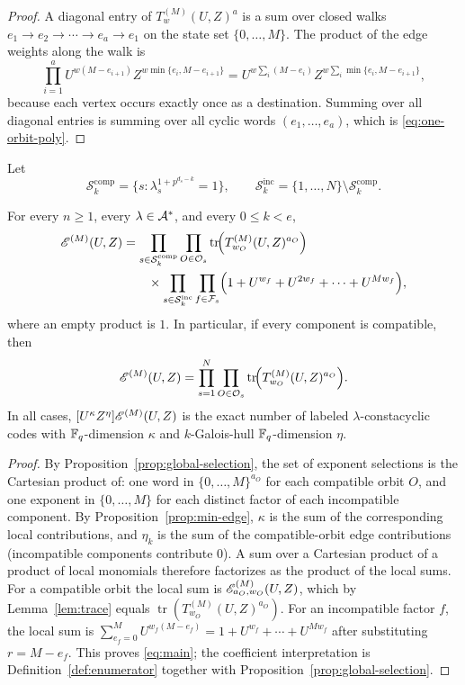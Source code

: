 \begin{proof}
A diagonal entry of $T^{(M)}_w(U,Z)^a$ is a sum over closed walks
$e_1\to e_2\to\cdots\to e_a\to e_1$ on the state set $\{0,\ldots,M\}$.
The product of the edge weights along the walk is
\[
\prod_{i=1}^{a}U^{w(M-e_{i+1})}Z^{w\min\{e_i,M-e_{i+1}\}}
 =U^{w\sum_i(M-e_i)}Z^{w\sum_i\min\{e_i,M-e_{i+1}\}},
\]
because each vertex occurs exactly once as a destination.  Summing over all
diagonal entries is summing over all cyclic words $(e_1,\ldots,e_a)$, which is
\eqref{eq:one-orbit-poly}.
\end{proof}

Let
\[
\mathcal{S}_k^{\mathrm{comp}}
 =\{s:\lambda_s^{1+p^{d_s-k}}=1\},
\qquad
\mathcal{S}_k^{\mathrm{inc}}=\{1,\ldots,N\}\setminus
                               \mathcal{S}_k^{\mathrm{comp}} .
\]

\begin{theorem}\label{thm:main}
For every $n\geq1$, every $\lambda\in\mathcal A^\ast$, and every $0\leq k<e$,
\begin{align}
\mathscr E^{(M)}(U,Z)
&=\prod_{s\in\mathcal{S}_k^{\mathrm{comp}}}
   \prod_{O\in\mathcal O_s}
     \operatorname{tr}\!\Bigl(T^{(M)}_{w_O}(U,Z)^{a_O}\Bigr)
   \notag\\
&\qquad\times
  \prod_{s\in\mathcal{S}_k^{\mathrm{inc}}}
   \prod_{f\in\mathcal F_s}
     \Bigl(1+U^{w_f}+U^{2w_f}+\cdots+U^{Mw_f}\Bigr),
\label{eq:main}
\end{align}
where an empty product is $1$.  In particular, if every component is
compatible, then
\[
\mathscr E^{(M)}(U,Z)
 =\prod_{s=1}^{N}\prod_{O\in\mathcal O_s}
   \operatorname{tr}\!\Bigl(T^{(M)}_{w_O}(U,Z)^{a_O}\Bigr).
\]
In all cases, $[U^\kappa Z^\eta]\mathscr E^{(M)}(U,Z)$ is the exact number of labeled
$\lambda$-constacyclic codes with $\mathbb F_q$-dimension $\kappa$ and
$k$-Galois-hull $\mathbb F_q$-dimension $\eta$.
\end{theorem}

\begin{proof}
By Proposition~\ref{prop:global-selection}, the set of exponent selections is
the Cartesian product of: one word in $\{0,\ldots,M\}^{a_O}$ for each
compatible orbit $O$, and one exponent in $\{0,\ldots,M\}$ for each distinct
factor of each incompatible component.  By
Proposition~\ref{prop:min-edge}, $\kappa$ is the sum of the corresponding
local contributions, and $\eta_k$ is the sum of the compatible-orbit edge
contributions (incompatible components contribute $0$).  A sum over a Cartesian
product of a product of local monomials therefore factorizes as the product of
the local sums.  For a compatible orbit the local sum is
$\mathscr E_{a_O,w_O}^{(M)}(U,Z)$, which by Lemma~\ref{lem:trace} equals
$\operatorname{tr}(T^{(M)}_{w_O}(U,Z)^{a_O})$.  For an incompatible factor
$f$, the local sum is
$\sum_{e_f=0}^{M}U^{w_f(M-e_f)}
 =1+U^{w_f}+\cdots+U^{Mw_f}$ after substituting $r=M-e_f$.  This proves
\eqref{eq:main}; the coefficient interpretation is
Definition~\ref{def:enumerator} together with
Proposition~\ref{prop:global-selection}.
\end{proof}

